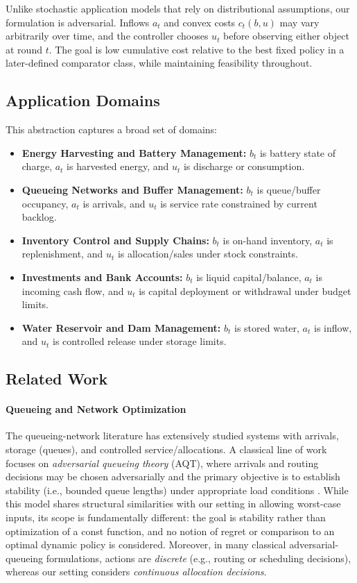 \documentclass[11pt]{article}
\begin{document}
Unlike stochastic application models that rely on distributional assumptions, our formulation is adversarial. Inflows $a_t$ and convex costs $c_t(b, u)$ may vary arbitrarily over time, and the controller chooses $u_t$ before observing either object at round $t$. The goal is low cumulative cost relative to the best fixed policy in a later-defined comparator class, while maintaining feasibility throughout.

\subsection{Application Domains}
This abstraction captures a broad set of domains:
\begin{itemize}
    \item \textbf{Energy Harvesting and Battery Management:} $b_t$ is battery state of charge, $a_t$ is harvested energy, and $u_t$ is discharge or consumption.
    \item \textbf{Queueing Networks and Buffer Management:} $b_t$ is queue/buffer occupancy, $a_t$ is arrivals, and $u_t$ is service rate constrained by current backlog.
    \item \textbf{Inventory Control and Supply Chains:} $b_t$ is on-hand inventory, $a_t$ is replenishment, and $u_t$ is allocation/sales under stock constraints.
    \item \textbf{Investments and Bank Accounts:} $b_t$ is liquid capital/balance, $a_t$ is incoming cash flow, and $u_t$ is capital deployment or withdrawal under budget limits.
    \item \textbf{Water Reservoir and Dam Management:} $b_t$ is stored water, $a_t$ is inflow, and $u_t$ is controlled release under storage limits.
\end{itemize}


\subsection{Related Work}
\paragraph{Queueing and Network Optimization}
The queueing-network literature has extensively studied systems with arrivals, storage (queues), and controlled service/allocations. A classical line of work focuses on \emph{adversarial queueing theory} (AQT), where arrivals and routing decisions may be chosen adversarially and the primary objective is to establish stability (i.e., bounded queue lengths) under appropriate load conditions \cite{borodin2001adversarial, gamarnik1998stability, kiwi2005survey}. While this model shares structural similarities with our setting in allowing worst-case inputs, its scope is fundamentally different: the goal is stability rather than optimization of a const function, and no notion of regret or comparison to an optimal dynamic policy is considered. Moreover, in many classical adversarial-queueing formulations, actions are \emph{discrete} (e.g., routing or scheduling decisions), whereas our setting considers \emph{continuous allocation decisions}.
\end{document}
